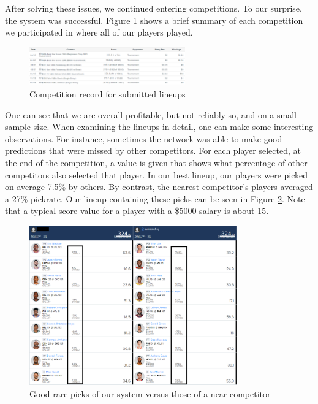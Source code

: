After solving these issues, we continued entering competitions. To our surprise, the system was successful. Figure \ref{fig:win_record} shows a brief summary of each competition we participated in where all of our players played.
\begin{figure}[ht]
    \centering
    \includegraphics[width=0.6\textwidth]{figures/fanduel_comp}
    \caption{Competition record for submitted lineups}
    \label{fig:win_record}
\end{figure}
One can see that we are overall profitable, but not reliably so, and on a small sample size. When examining the lineups in detail, one can make some interesting observations. For instance, sometimes the network was able to make good predictions that were missed by other competitors. For each player selected, at the end of the competition, a value is given that shows what percentage of other competitors also selected that player. In our best lineup, our players were picked on average 7.5\% by others. By contrast, the nearest competitor's players averaged a 27\% pickrate. Our lineup containing these picks can be seen in Figure \ref{fig:good_picks}. Note that a typical score value for a player with a \$5000 salary is about 15.

\begin{figure}[ht]
    \centering
    \includegraphics[width=0.8\textwidth]{figures/mevsbest}
    \caption{Good rare picks of our system versus those of a near competitor}
    \label{fig:good_picks}
\end{figure}

